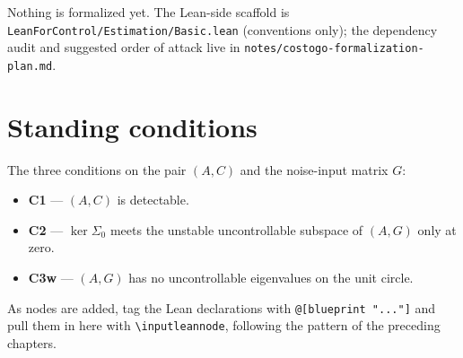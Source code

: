Nothing is formalized yet. The Lean-side scaffold is
\texttt{LeanForControl/Estimation/Basic.lean} (conventions only); the
dependency audit and suggested order of attack live in
\texttt{notes/costogo-formalization-plan.md}.

\section{Standing conditions}

The three conditions on the pair $(A, C)$ and the noise-input matrix $G$:
\begin{itemize}
  \item \textbf{C1} --- $(A, C)$ is detectable.
  \item \textbf{C2} --- $\ker \Sigma_0$ meets the unstable uncontrollable
        subspace of $(A, G)$ only at zero.
  \item \textbf{C3w} --- $(A, G)$ has no uncontrollable eigenvalues on the
        unit circle.
\end{itemize}

As nodes are added, tag the Lean declarations with \texttt{@[blueprint "..."]}
and pull them in here with \texttt{\textbackslash inputleannode}, following the
pattern of the preceding chapters.
